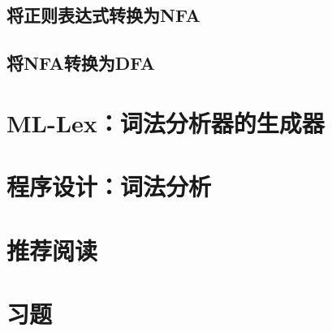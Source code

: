 \documentclass[cn,11pt,chinese]{elegantbook}
\begin{document}
\subsection{将正则表达式转换为NFA}

\subsection{将NFA转换为DFA}

\section{ML-Lex：词法分析器的生成器}

\section{程序设计：词法分析}

\section{推荐阅读}

\section{习题}
\end{document}
